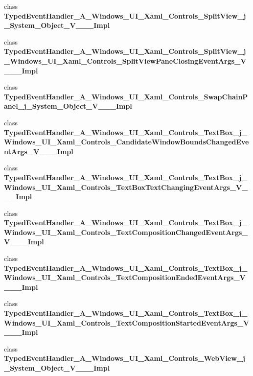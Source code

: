 \begin{DoxyCompactItemize}
\item 
class {\bfseries Typed\+Event\+Handler\+\_\+\+A\+\_\+\+Windows\+\_\+\+U\+I\+\_\+\+Xaml\+\_\+\+Controls\+\_\+\+Split\+View\+\_\+j\+\_\+\+System\+\_\+\+Object\+\_\+\+V\+\_\+\+\_\+\+\_\+\+Impl}
\item 
class {\bfseries Typed\+Event\+Handler\+\_\+\+A\+\_\+\+Windows\+\_\+\+U\+I\+\_\+\+Xaml\+\_\+\+Controls\+\_\+\+Split\+View\+\_\+j\+\_\+\+Windows\+\_\+\+U\+I\+\_\+\+Xaml\+\_\+\+Controls\+\_\+\+Split\+View\+Pane\+Closing\+Event\+Args\+\_\+\+V\+\_\+\+\_\+\+\_\+\+Impl}
\item 
class {\bfseries Typed\+Event\+Handler\+\_\+\+A\+\_\+\+Windows\+\_\+\+U\+I\+\_\+\+Xaml\+\_\+\+Controls\+\_\+\+Swap\+Chain\+Panel\+\_\+j\+\_\+\+System\+\_\+\+Object\+\_\+\+V\+\_\+\+\_\+\+\_\+\+Impl}
\item 
class {\bfseries Typed\+Event\+Handler\+\_\+\+A\+\_\+\+Windows\+\_\+\+U\+I\+\_\+\+Xaml\+\_\+\+Controls\+\_\+\+Text\+Box\+\_\+j\+\_\+\+Windows\+\_\+\+U\+I\+\_\+\+Xaml\+\_\+\+Controls\+\_\+\+Candidate\+Window\+Bounds\+Changed\+Event\+Args\+\_\+\+V\+\_\+\+\_\+\+\_\+\+Impl}
\item 
class {\bfseries Typed\+Event\+Handler\+\_\+\+A\+\_\+\+Windows\+\_\+\+U\+I\+\_\+\+Xaml\+\_\+\+Controls\+\_\+\+Text\+Box\+\_\+j\+\_\+\+Windows\+\_\+\+U\+I\+\_\+\+Xaml\+\_\+\+Controls\+\_\+\+Text\+Box\+Text\+Changing\+Event\+Args\+\_\+\+V\+\_\+\+\_\+\+\_\+\+Impl}
\item 
class {\bfseries Typed\+Event\+Handler\+\_\+\+A\+\_\+\+Windows\+\_\+\+U\+I\+\_\+\+Xaml\+\_\+\+Controls\+\_\+\+Text\+Box\+\_\+j\+\_\+\+Windows\+\_\+\+U\+I\+\_\+\+Xaml\+\_\+\+Controls\+\_\+\+Text\+Composition\+Changed\+Event\+Args\+\_\+\+V\+\_\+\+\_\+\+\_\+\+Impl}
\item 
class {\bfseries Typed\+Event\+Handler\+\_\+\+A\+\_\+\+Windows\+\_\+\+U\+I\+\_\+\+Xaml\+\_\+\+Controls\+\_\+\+Text\+Box\+\_\+j\+\_\+\+Windows\+\_\+\+U\+I\+\_\+\+Xaml\+\_\+\+Controls\+\_\+\+Text\+Composition\+Ended\+Event\+Args\+\_\+\+V\+\_\+\+\_\+\+\_\+\+Impl}
\item 
class {\bfseries Typed\+Event\+Handler\+\_\+\+A\+\_\+\+Windows\+\_\+\+U\+I\+\_\+\+Xaml\+\_\+\+Controls\+\_\+\+Text\+Box\+\_\+j\+\_\+\+Windows\+\_\+\+U\+I\+\_\+\+Xaml\+\_\+\+Controls\+\_\+\+Text\+Composition\+Started\+Event\+Args\+\_\+\+V\+\_\+\+\_\+\+\_\+\+Impl}
\item 
class {\bfseries Typed\+Event\+Handler\+\_\+\+A\+\_\+\+Windows\+\_\+\+U\+I\+\_\+\+Xaml\+\_\+\+Controls\+\_\+\+Web\+View\+\_\+j\+\_\+\+System\+\_\+\+Object\+\_\+\+V\+\_\+\+\_\+\+\_\+\+Impl}
\item 

\end{DoxyCompactItemize}
